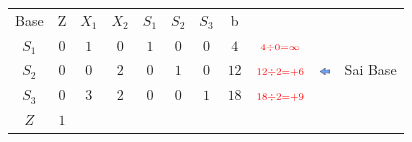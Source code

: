 \begin{frame}
{\begin{table}
\begin{tabular}{c c c c c c c c c c c}
			\end{tabular}
		\end{table}			
	}	
	{		
		\begin{table}		
			\begin{tabular}{c c c c c c c c c c c}
				\cline{1-8} 
				\cellcolor{blue!100} \color{white} \scriptsize Base 
				&\cellcolor{blue!100} \color{white} \scriptsize Z 
				&\cellcolor{blue!100} \color{white} $\scriptstyle X_1$ 
				&\cellcolor{blue!100} \color{white} $\scriptstyle X_2$ 
				&\cellcolor{blue!100} \color{red} $\scriptstyle S_1$ 
				&\cellcolor{blue!100} \color{red} $\scriptstyle S_2$ 
				&\cellcolor{blue!100} \color{red} $\scriptstyle S_3$ 
				&\cellcolor{blue!100} \color{white} \scriptsize b
				&
				&
				& \\
				\cline{1-8}
				\cellcolor{blue!100} \color{red} $\scriptstyle S_1$
				& \cellcolor{yellow!50} $\scriptstyle 0$
				& \cellcolor{yellow!50} $\scriptstyle 1$
				& \cellcolor{gray!50} $\scriptstyle 0$
				& \cellcolor{yellow!50} $\scriptstyle 1$
				& \cellcolor{yellow!50} $\scriptstyle 0$
				& \cellcolor{yellow!50} $\scriptstyle 0$
				& \cellcolor{gray!50} $\scriptstyle 4$
				& $ \scriptstyle \color{red} 4 \div 0 = \infty $
				&
				& \\
				\cline{1-8} 
				\cellcolor{blue!100} \color{red} $\scriptstyle S_2$
				& \cellcolor{gray!50} $\scriptstyle 0$
				& \cellcolor{gray!50} $\scriptstyle 0$
				& \cellcolor{gray!50} $\scriptstyle 2$
				& \cellcolor{gray!50} $\scriptstyle 0$			
				& \cellcolor{gray!50} $\scriptstyle 1$
				& \cellcolor{gray!50} $\scriptstyle 0$
				& \cellcolor{gray!50} $\scriptstyle 12$
				& $ \scriptstyle \color{red} 12 \div 2 = +6 $
				& \scriptsize \includegraphics[width=0.3cm,height=0.2cm]{setaesquerda.jpg}
				& \scriptsize \color{red} Sai Base \\
				\cline{1-8} 
				\cellcolor{blue!100} \color{red} $\scriptstyle S_3$
				& \cellcolor{yellow!50} $\scriptstyle 0$
				& \cellcolor{yellow!50} $\scriptstyle 3$
				& \cellcolor{gray!50} $\scriptstyle 2$
				& \cellcolor{yellow!50} $\scriptstyle 0$
				& \cellcolor{yellow!50} $\scriptstyle 0$
				& \cellcolor{yellow!50} $\scriptstyle 1$
				& \cellcolor{gray!50} $\scriptstyle 18$
				& $ \scriptstyle \color{red} 18 \div 2 = +9 $
				&
				& \\
				\cline{1-8}
				\cellcolor{blue!100} \color{white} $\scriptstyle Z$
				& \cellcolor{yellow!50} $\scriptstyle 1$

\end{tabular}
\end{table}}
\end{frame}
